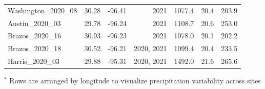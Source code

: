 \begin{table}
{\begin{tabular}{p{5cm}p{3cm}p{3cm}p{3cm}p{3cm}p{3cm}p{3cm}}
            \multicolumn{1}{l}{Washington\_2020\_08} 
            & \multicolumn{1}{r}{30.28}
            & \multicolumn{1}{r}{-96.41}
            & \multicolumn{1}{r}{2021}
            & \multicolumn{1}{r}{1077.4}
            & \multicolumn{1}{r}{20.4}
            & \multicolumn{1}{r}{203.9}
            \\

            \multicolumn{1}{l}{Austin\_2020\_03} 
            & \multicolumn{1}{r}{29.78}
            & \multicolumn{1}{r}{-96.24}
            & \multicolumn{1}{r}{2021}
            & \multicolumn{1}{r}{1108.7}
            & \multicolumn{1}{r}{20.6}
            & \multicolumn{1}{r}{253.0}
            \\

            \multicolumn{1}{l}{Brazos\_2020\_16} 
            & \multicolumn{1}{r}{30.93}
            & \multicolumn{1}{r}{-96.23}
            & \multicolumn{1}{r}{2021}
            & \multicolumn{1}{r}{1078.0}
            & \multicolumn{1}{r}{20.1}
            & \multicolumn{1}{r}{202.2}
            \\

            \multicolumn{1}{l}{Brazos\_2020\_18} 
            & \multicolumn{1}{r}{30.52}
            & \multicolumn{1}{r}{-96.21}
            & \multicolumn{1}{r}{2020, 2021}
            & \multicolumn{1}{r}{1099.4}
            & \multicolumn{1}{r}{20.4}
            & \multicolumn{1}{r}{233.5}
            \\

            \multicolumn{1}{l}{Harris\_2020\_03} 
            & \multicolumn{1}{r}{29.88}
            & \multicolumn{1}{r}{-95.31}
            & \multicolumn{1}{r}{2020, 2021}
            & \multicolumn{1}{r}{1492.0}
            & \multicolumn{1}{r}{21.6}
            & \multicolumn{1}{r}{265.6}
            \\
            \hline

        \end{tabular}}
        \label{tab:table4.1}
\end{table}
\noindent $^*$ Rows are arranged by longitude to visualize precipitation variability across sites
\clearpage

